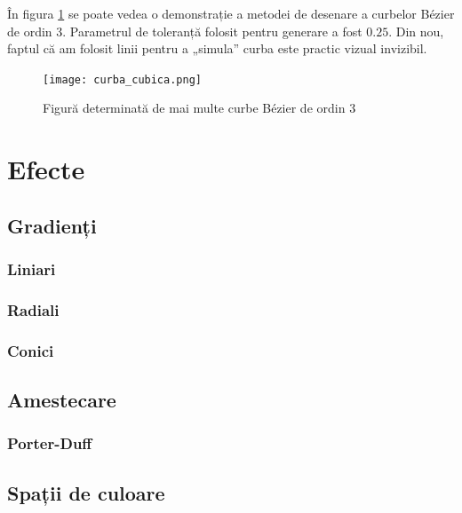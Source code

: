 \documentclass[a4paper, 12pt]{report}
\begin{document}
În figura \ref{fig-cubic-example} se poate vedea o demonstrație a metodei de desenare a curbelor Bézier de ordin 3.
Parametrul de toleranță folosit pentru generare a fost \(0.25\). Din nou, faptul că am folosit linii pentru a „simula”
curba este practic vizual invizibil.

\begin{figure}[ht]
    \texttt{[image: curba\_cubica.png]}
    \centering
    \caption{Figură determinată de mai multe curbe Bézier de ordin 3}
    \label{fig-cubic-example}
\end{figure}

\chapter{Efecte}

\section{Gradienți}

\subsection{Liniari}
\subsection{Radiali}
\subsection{Conici}

\section{Amestecare}
\subsection{Porter-Duff}

\section{Spații de culoare}

\printbibliography
\end{document}
